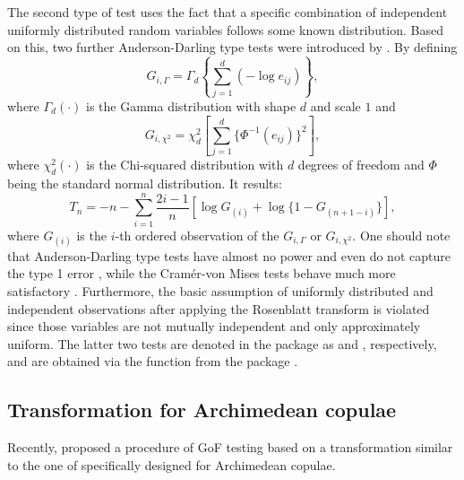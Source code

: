 The second type of test uses the fact that a specific combination of independent uniformly distributed random variables follows some known distribution. Based on this, two further Anderson-Darling type tests were introduced by \citet{breymann_dias_embrechts_2003}. By defining
\begin{equation*}
	G_{i,\Gamma} = \Gamma_d\left\{\sum_{j=1}^d (- \log e_{ij})\right\},
\end{equation*}
where $\Gamma_d(\cdot)$ is the Gamma distribution with shape $d$ and scale $1$ and
\begin{equation*}
	G_{i, \chi^2} = \chi_d^2\left[\sum_{j=1}^d \{\Phi^{-1}(e_{ij})\}^2\right],
\end{equation*}
where $\chi_d^2(\cdot)$ is the Chi-squared distribution with $d$ degrees of freedom and $\Phi$ being the standard normal distribution. It results:
\begin{equation*}
T_n = -n - \sum_{i=1}^n \frac{2i - 1}{n} [\log G_{(i)} + \log\{1 - G_{(n+1-i)}\}],
\end{equation*}
where $G_{(i)}$ is the $i$-th ordered observation of the $G_{i, \Gamma}$ or $G_{i, \chi^2}$. One should note that Anderson-Darling type tests have almost no power and even do not capture the type 1 error \citep{dobric_schmid_2007}, while the Cram\'{e}r-von Mises tests behave much more satisfactory \citep{genest_remillard_beaudoin_2009}. Furthermore, the basic assumption of uniformly distributed and independent observations after applying the Rosenblatt transform is violated since those variables are not mutually independent and only approximately uniform. The latter two tests are denoted in the package as  and , respectively, and are obtained via the function  from the package .

\mycolor
\subsection{Transformation for Archimedean copulae}\label{subsec:gof_Archm}
Recently, \cite{Arch2015goodness} proposed a procedure of GoF testing based on a transformation similar to the one of \cite{rosenblatt_1952} specifically designed for Archimedean copulae.

